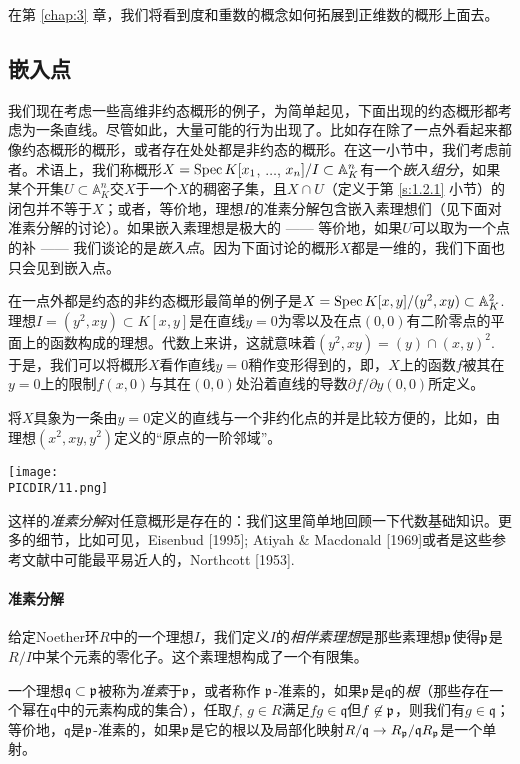 在第 \ref{chap:3} 章，我们将看到度和重数的概念如何拓展到正维数的概形上面去。

\subsection{嵌入点}

我们现在考虑一些高维非约态概形的例子，为简单起见，下面出现的约态概形都考虑为一条直线。尽管如此，大量可能的行为出现了。比如存在除了一点外看起来都像约态概形的概形，或者存在处处都是非约态的概形。在这一小节中，我们考虑前者。术语上，我们称概形$X=\operatorname{Spec} K[x_1$, $\dots$, $x_n]/I\subset \mathbb{A}_{K}^n$有一个\textit{嵌入组分}，如果某个开集$U\subset \mathbb{A}^n_K$交$X$于一个$X$的稠密子集，且$X\cap U$（定义于第 \ref{s:1.2.1} 小节）的闭包并不等于$X$；或者，等价地，理想$I$的准素分解包含嵌入素理想们（见下面对准素分解的讨论）。如果嵌入素理想是极大的 ------ 等价地，如果$U$可以取为一个点的补 ------ 我们谈论的是\textit{嵌入点}。因为下面讨论的概形$X$都是一维的，我们下面也只会见到嵌入点。

在一点外都是约态的非约态概形最简单的例子是$X=\operatorname{Spec} K[x,y]/(y^2,xy)\subset \mathbb{A}_K^2$. 理想$I=(y^2,xy)\subset K[x,y]$是在直线$y=0$为零以及在点$(0,0)$有二阶零点的平面上的函数构成的理想。代数上来讲，这就意味着$(y^2,xy)=(y)\cap (x,y)^2$. 于是，我们可以将概形$X$看作直线$y=0$稍作变形得到的，即，$X$上的函数$f$被其在$y=0$上的限制$f(x,0)$与其在$(0,0)$处沿着直线的导数$\partial f/\partial y(0,0)$所定义。

将$X$具象为一条由$y=0$定义的直线与一个非约化点的并是比较方便的，比如，由理想$(x^2,xy,y^2)$定义的“原点的一阶邻域”。

\begin{center}\texttt{[image: \\PICDIR/11.png]}\end{center}

这样的\textit{准素分解}对任意概形是存在的：我们这里简单地回顾一下代数基础知识。更多的细节，比如可见，Eisenbud [1995]; Atiyah \& Macdonald [1969]或者是这些参考文献中可能最平易近人的，Northcott [1953].

\paragraph*{准素分解} 
给定Noether环$R$中的一个理想$I$，我们定义$I$的\textit{相伴素理想}是那些素理想$\mathfrak{p}$使得$\mathfrak{p}$是$R/I$中某个元素的零化子。这个素理想构成了一个有限集。

一个理想$\mathfrak{q}\subset \mathfrak{p}$被称为\textit{准素}于$\mathfrak{p}$，或者称作
$\mathfrak{p}$-准素的，如果$\mathfrak{p}$是$\mathfrak{q}$的\textit{根}（那些存在一个幂在$\mathfrak{q}$中的元素构成的集合），任取$f$, $g\in R$满足$fg\in \mathfrak{q}$但$f\not\in \mathfrak{p}$，则我们有$g\in\mathfrak{q}$；等价地，$\mathfrak{q}$是$\mathfrak{p}$-准素的，如果$\mathfrak{p}$是它的根以及局部化映射$R/\mathfrak{q}\to R_{\mathfrak{p}}/\mathfrak{q}R_{\mathfrak{p}}$是一个单射。

